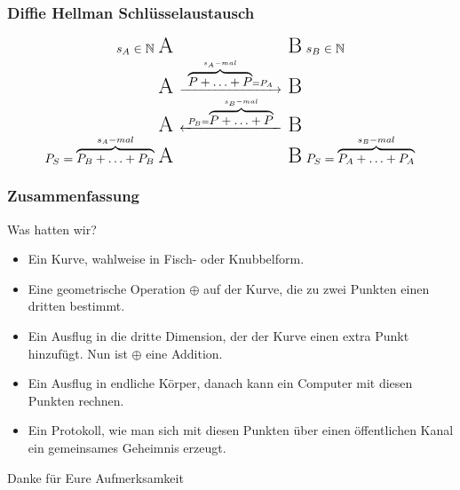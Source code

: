 \documentclass{beamer}
\newcommand{\N}{\mathbb{N}}
\begin{document}
\begin{frame}
  \frametitle{Diffie Hellman Schlüsselaustausch}
  \begin{equation*}
    \begin{CD}
      {\hbox to 0pt{\hss $s_A \in \N$ }}\text{\LARGE A}
      @. \text
      {\LARGE B}{\hbox to 0pt{ $s_B \in \N$\hss}} \\
      \text{\LARGE A}
      @>\ \overbrace{P + \ldots + P}^{s_A-mal} = P_A\ >>
      \text{\LARGE B} \\
      \text{\LARGE A}
      @<\ P_B = \overbrace{P + \ldots + P}^{s_B-mal}\ <<
      \text{\LARGE B} \\
      {\hbox to 0pt{\hss $P_S = \overbrace{P_B + \ldots + P_B}^{s_A-mal}$ }}
      \text{\LARGE A}
      @.
      \text{\LARGE B}
      {\hbox to 0pt{ $P_S = \overbrace{P_A + \ldots + P_A}^{s_B-mal}$\hss}}
    \end{CD}
  \end{equation*}
\end{frame}

\begin{frame}
  \frametitle{Zusammenfassung}
  \vspace*{-1cm}
  Was hatten wir?
  \begin{itemize}
  \item Ein Kurve, wahlweise in Fisch- oder Knubbelform.
  \item Eine geometrische Operation $\oplus$ auf der Kurve, die zu zwei
    Punkten einen dritten bestimmt.
  \item Ein Ausflug in die dritte Dimension, der der Kurve einen extra Punkt
    hinzufügt. Nun ist $\oplus$ eine Addition.
  \item Ein Ausflug in endliche Körper, danach kann ein Computer mit diesen
    Punkten rechnen.
  \item Ein Protokoll, wie man sich mit diesen Punkten über einen öffentlichen
    Kanal ein gemeinsames Geheimnis erzeugt.
  \end{itemize}
\end{frame}

\begin{frame}
  \begin{center}
    \Large Danke für Eure Aufmerksamkeit
  \end{center}
\end{frame}
\end{document}

